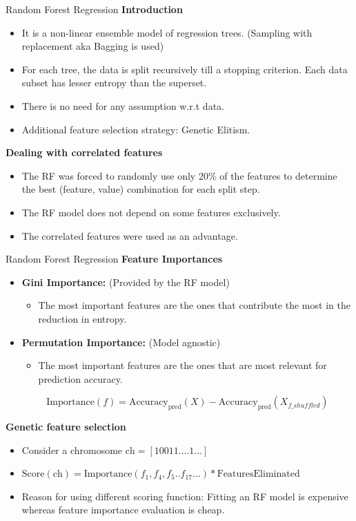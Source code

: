 \documentclass{beamer}
\begin{document}
\begin{frame}[t]{Random Forest Regression}
\textbf{Introduction}
\begin{itemize}
\item It is a non-linear ensemble model of regression trees.  (Sampling with replacement aka Bagging is used)
\item For each tree,  the data is split recursively till a stopping criterion.  Each data subset has lesser entropy than the superset.
\item There is no need for any assumption w.r.t data.
\item Additional feature selection strategy: Genetic Elitism.
\end{itemize}
\textbf{Dealing with correlated features}
\begin{itemize}
\item The RF was forced to randomly use only 20\% of the features to determine the best (feature, value) combination for each split step.
\item The RF model does not depend on some features exclusively.
\item The correlated features were used as an advantage.
\end{itemize}
\end{frame}
 
 \begin{frame}[t]{Random Forest Regression}
\textbf{Feature Importances}
\begin{itemize}
\item \textbf{Gini Importance:} (Provided by the RF model) 
\begin{itemize}
\item The most important features are the ones that contribute the most in the reduction in entropy.
\end{itemize}  
\item \textbf{Permutation Importance:} (Model agnostic)
\begin{itemize}
\item The most important features are the ones that are most relevant for prediction accuracy.
\end{itemize}
$$\mathrm{Importance}(f) = \mathrm{Accuracy_{pred}}(X) - \mathrm{Accuracy_{pred}}(X_{f\_shuffled})$$
\end{itemize}

\textbf{Genetic feature selection}
\begin{itemize}
\item Consider a chromosome $\mathrm{ch} = [10011....1...]$
\item $\mathrm{Score}(\mathrm{ch}) = \mathrm{Importance}(f_1,  f_4, f_5 ..f_{17}... ) * \mathrm{FeaturesEliminated}$
\item Reason for using different scoring function: Fitting an RF model is expensive whereas feature importance evaluation is cheap.
\end{itemize}

\end{frame}
\end{document}
